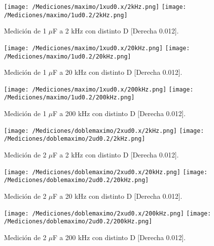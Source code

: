 \begin{figure}[H]
	\centering
	\texttt{[image: /Mediciones/maximo/1xud0.x/2kHz.png]}
	\texttt{[image: /Mediciones/maximo/1ud0.2/2kHz.png]}
\caption{Medición de 1 $\mu$F a 2 kHz con distinto D [Derecha 0.012].}
	\label{fig:fcon7}
\end{figure}
\begin{figure}[H]
	\centering
	\texttt{[image: /Mediciones/maximo/1xud0.x/20kHz.png]}
	\texttt{[image: /Mediciones/maximo/1ud0.2/20kHz.png]}
\caption{Medición de 1 $\mu$F a 20 kHz con distinto D [Derecha 0.012].}
	\label{fig:fcon8}
\end{figure}
\begin{figure}[H]
	\centering
	\texttt{[image: /Mediciones/maximo/1xud0.x/200kHz.png]}
	\texttt{[image: /Mediciones/maximo/1ud0.2/200kHz.png]}
\caption{Medición de 1 $\mu$F a 200 kHz con distinto D [Derecha 0.012].}
	\label{fig:fcon9}
\end{figure}
\begin{figure}[H]
	\centering
	\texttt{[image: /Mediciones/doblemaximo/2xud0.x/2kHz.png]}
	\texttt{[image: /Mediciones/doblemaximo/2ud0.2/2kHz.png]}
\caption{Medición de 2 $\mu$F a 2 kHz con distinto D [Derecha 0.012].}
	\label{fig:fcon10}
\end{figure}
\begin{figure}[H]
	\centering
	\texttt{[image: /Mediciones/doblemaximo/2xud0.x/20kHz.png]}
	\texttt{[image: /Mediciones/doblemaximo/2ud0.2/20kHz.png]}
\caption{Medición de 2 $\mu$F a 20 kHz con distinto D [Derecha 0.012].}
	\label{fig:fcon11}
\end{figure}
\begin{figure}[H]
	\centering
	\texttt{[image: /Mediciones/doblemaximo/2xud0.x/200kHz.png]}
	\texttt{[image: /Mediciones/doblemaximo/2ud0.2/200kHz.png]}
\caption{Medición de 2 $\mu$F a 200 kHz con distinto D [Derecha 0.012].}
	\label{fig:fcon12}
\end{figure}

